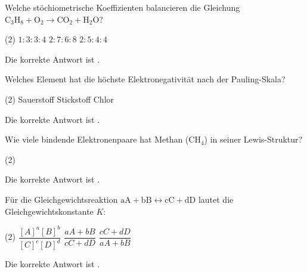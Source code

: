 \begin{exercise}[subtitle=Chemische Gleichung, points=0.5, Punkt=0.5]
Welche stöchiometrische Koeffizienten balancieren die Gleichung \(\mathrm{C_3H_8 + O_2 \rightarrow CO_2 + H_2O}\)?
\begin{choices}(2)
  \task \(\mathrm{1:3:3:4}\)
  \task \(\mathrm{2:7:6:8}\)
  \task {}
  \task \(\mathrm{2:5:4:4}\)
\end{choices}
\begin{solution}
Die korrekte Antwort ist \textbf{}.
\end{solution}
\end{exercise}

\begin{exercise}[subtitle=Elektronegativität, points=0.5, Punkt=0.5]
Welches Element hat die höchste Elektronegativität nach der Pauling-Skala?
\begin{choices}(2)
  \task Sauerstoff
  \task Stickstoff
  \task Chlor
  \task {}
\end{choices}
\begin{solution}
Die korrekte Antwort ist \textbf{}.
\end{solution}
\end{exercise}

\begin{exercise}[subtitle=Lewis-Struktur, points=0.5, Punkt=0.5]
Wie viele bindende Elektronenpaare hat Methan (\(\mathrm{CH_4}\)) in seiner Lewis-Struktur?
\begin{choices}(2)
  \task {}
\end{choices}
\begin{solution}
Die korrekte Antwort ist \textbf{}.
\end{solution}
\end{exercise}

\begin{exercise}[subtitle=Massenwirkungsgesetz, points=0.5, Punkt=0.5]
Für die Gleichgewichtsreaktion \(\mathrm{aA + bB \leftrightarrow cC + dD}\) lautet die Gleichgewichtskonstante \(K\):
\begin{choices}(2)
  \task \(\dfrac{[A]^a[B]^b}{[C]^c[D]^d}\)
  \task {}
  \task \(\dfrac{aA + bB}{cC + dD}\)
  \task \(\dfrac{cC + dD}{aA + bB}\)
\end{choices}
\begin{solution}
Die korrekte Antwort ist \textbf{}.
\end{solution}
\end{exercise}

